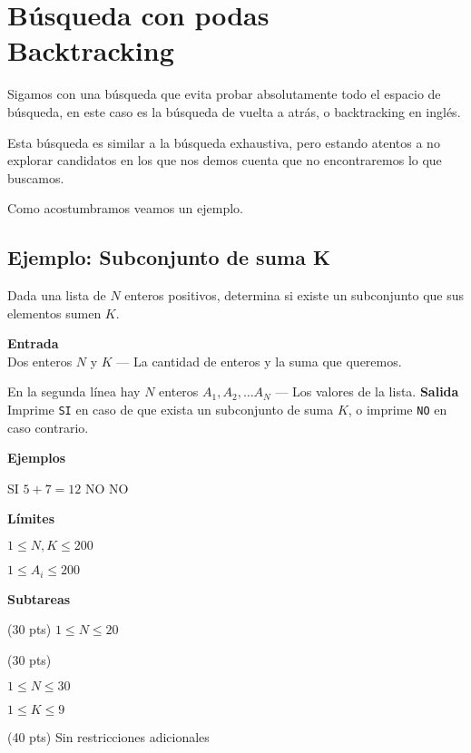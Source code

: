 \chapter[Búsqueda con podas]{Búsqueda con podas\\ Backtracking}

Sigamos con una búsqueda que evita probar absolutamente todo el espacio de búsqueda, en este caso es la búsqueda de vuelta a atrás, o backtracking en inglés.

Esta búsqueda es similar a la búsqueda exhaustiva, pero estando atentos a no explorar candidatos en los que nos demos cuenta que no encontraremos lo que buscamos.

Como acostumbramos veamos un ejemplo.

\section*{Ejemplo: Subconjunto de suma K}

Dada una lista de \(N\) enteros positivos, determina si existe un subconjunto que sus elementos sumen \(K\).

\textbf{Entrada}\\
Dos enteros \(N\) y \(K\) --- La cantidad de enteros y la suma que queremos.

En la segunda línea hay \(N\) enteros \(A_1, A_2, \ldots A_N\) --- Los valores de la lista.
\textbf{Salida}\\
Imprime \verb|SI| en caso de que exista un subconjunto de suma \(K\), o imprime \verb|NO| en caso contrario.

\textbf{Ejemplos}\\
\begin{casebox3}
	 {
	SI
	}
	{
		\(5+7=12\)
	}
	 {
		NO
	}
	{
	}
	 {
	NO
	}
	{	
	}
\end{casebox3}

\textbf{Límites}
\begin{plimits}
	\item \(1\leq N,K \leq 200\)
	\item \(1\leq A_i \leq 200\)
\end{plimits}
	
\textbf{Subtareas}
\begin{plimits}
	\item (30 pts) \(1\leq N \leq 20\)
	\item (30 pts)
	\begin{plimits}
		\item \(1\leq N \leq 30\)
		\item \(1\leq K \leq 9\)		
	\end{plimits}
	\item (40 pts) Sin restricciones adicionales
\end{plimits}

